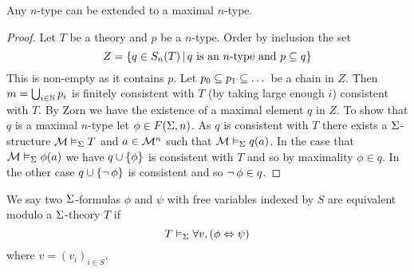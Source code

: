 \begin{prop}
    Any $n$-type can be extended to a maximal $n$-type.
\end{prop}
\begin{proof}
    Let $T$ be a theory and $p$ be a $n$-type.
    Order by inclusion the set
    \[ 
        Z = \left\{q \in S_n(T) \,|\, q \text{ is an } n\text{-type and }
        p \subseteq q\right\}
    \]
    This is non-empty as it contains $p$.
    Let $p_0 \subseteq p_1 \subseteq \dots$ be a chain in $Z$.
    Then $m = \bigcup_{i \in \mathbb{N}} p_i$ is finitely consistent with $T$
    (by taking large enough $i$)
     consistent with $T$. 
    By Zorn we have the existence of a maximal element $q$ in $Z$.
    To show that $q$ is a maximal $n$-type let $\phi \in F(\Sigma,n)$. 
    As $q$ is consistent with $T$ there exists a $\Sigma$-structure 
    $\mathcal{M} \vDash_{\Sigma} T$ and $a \in {\mathcal{M}}^n$ such that 
    $\mathcal{M} \vDash_{\Sigma} q(a)$. 
    In the case that $\mathcal{M} \vDash_{\Sigma} \phi(a)$
    we have $q \cup \left\{\phi\right\}$ is consistent with $T$ and so by 
    maximality $\phi \in q$.
    In the other case $q \cup \left\{\neg\, \phi\right\}$ is consistent and so
    $\neg\, \phi \in q$.
\end{proof}

\begin{dfn}
    We say two $\Sigma$-formulas $\phi$ and $\psi$ with 
    free variables indexed by $S$ are equivalent modulo a 
    $\Sigma$-theory $T$ if 
    \[T \vDash_{\Sigma} \forall v, \left(\phi \Leftrightarrow \psi\right)\]
    where $v = (v_i)_{i \in S}$.
\end{dfn}

